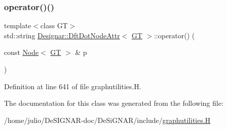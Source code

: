 \subsubsection{\texorpdfstring{operator()()}{operator()()}}
{\footnotesize\ttfamily template$<$class GT$>$ \\
std\+::string \hyperlink{class_designar_1_1_dft_dot_node_attr}{Designar\+::\+Dft\+Dot\+Node\+Attr}$<$ \hyperlink{demo-buildgraph_8_c_a3001c40d2c31ca87ed96cd7d1334a55e}{GT} $>$\+::operator() (\begin{DoxyParamCaption}\item[{const \hyperlink{namespace_designar_a5af326c65aa2bd26b26c410f2030d09e}{Node}$<$ \hyperlink{demo-buildgraph_8_c_a3001c40d2c31ca87ed96cd7d1334a55e}{GT} $>$ \&}]{p }\end{DoxyParamCaption})\hspace{0.3cm}{\ttfamily [inline]}}



Definition at line 641 of file graphutilities.\+H.



The documentation for this class was generated from the following file\+:\begin{DoxyCompactItemize}
\item 
/home/julio/\+De\+S\+I\+G\+N\+A\+R-\/doc/\+De\+Si\+G\+N\+A\+R/include/\hyperlink{graphutilities_8_h}{graphutilities.\+H}\end{DoxyCompactItemize}
